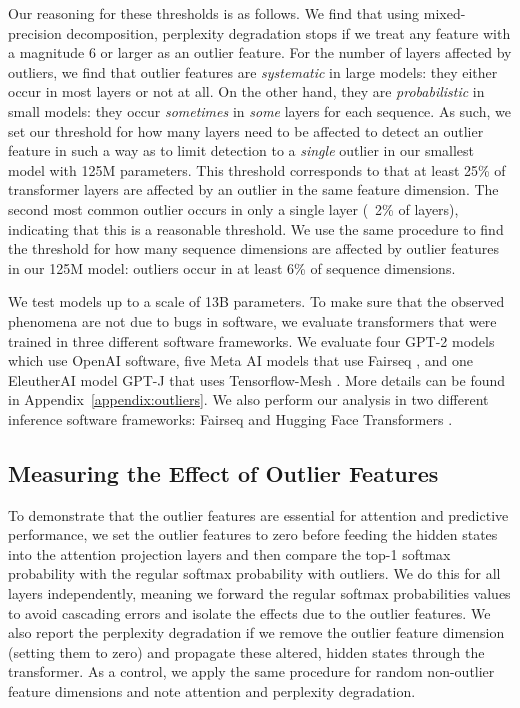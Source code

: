 \documentclass{article}
\begin{document}
Our reasoning for these thresholds is as follows. We find that using mixed-precision decomposition, perplexity degradation stops if we treat any feature with a magnitude 6 or larger as an outlier feature. 
For the number of layers affected by outliers, we find that outlier features are {\it systematic} in large models: they either occur in most layers or not at all. On the other hand, they are {\it probabilistic} in small models: they occur {\it sometimes} in {\it some} layers for each sequence. 
As such, we set our threshold for how many layers need to be affected to detect an outlier feature in such a way as to limit detection to a {\it single} outlier in our smallest model with 125M parameters. This threshold corresponds to that at least 25\% of transformer layers are affected by an outlier in the same feature dimension. The second most common outlier occurs in only a single layer (~2\% of layers), indicating that this is a reasonable threshold.
We use the same procedure to find the threshold for how many sequence dimensions are affected by outlier features in our 125M model: outliers occur in at least 6\% of sequence dimensions.

We test models up to a scale of 13B parameters. To make sure that the observed phenomena are not due to bugs in software, we evaluate transformers that were trained in three different software frameworks. We evaluate four GPT-2 models which use OpenAI software, five Meta AI models that use Fairseq \citep{ott2019fairseq}, and one EleutherAI model GPT-J that uses Tensorflow-Mesh \citep{shazeer2018mesh}. More details can be found in Appendix~\ref{appendix:outliers}. We also perform our analysis in two different inference software frameworks: Fairseq and Hugging Face Transformers \citep{wolf2019huggingface}. 

\subsection{Measuring the Effect of Outlier Features}

To demonstrate that the outlier features are essential for attention and predictive performance, we set the outlier features to zero before feeding the hidden states  into the attention projection layers and then compare the top-1 softmax probability with the regular softmax probability with outliers. We do this for all layers independently, meaning we forward the regular softmax probabilities values to avoid cascading errors and isolate the effects due to the outlier features.
We also report the perplexity degradation if we remove the outlier feature dimension (setting them to zero) and propagate these altered, hidden states through the transformer. As a control, we apply the same procedure for random non-outlier feature dimensions and note attention and perplexity degradation.
\end{document}
